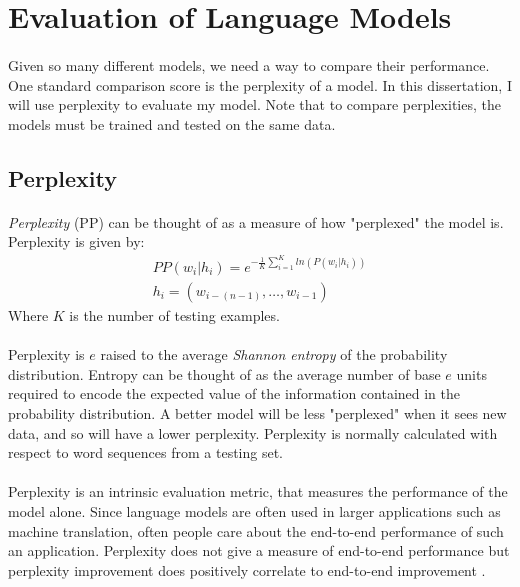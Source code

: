 \section {Evaluation of Language Models}
\paragraph{}
Given so many different models, we need a way to compare their performance. One standard comparison score is the perplexity of a model. In this dissertation, I will use perplexity to evaluate my model. Note that to compare perplexities, the models must be trained and tested on the same data.
\subsection{Perplexity} \label{sec:perplexity}
\paragraph{}
\emph{Perplexity} (PP) can be thought of as a measure of how "perplexed" the model is.
Perplexity is given by:
\begin{align}
PP(w_i | h_i)=e^{- \frac{1}{K} \sum_{i=1}^K ln( P(w_i | h_i) ) } \label{eq:perplexity}
\\ h_i = ( w_{i-(n-1)},\dots, w_{i-1} ) \nonumber
\end{align}
Where $K$ is the number of testing examples. 
\paragraph{}
Perplexity is $e$ raised to the average \emph{Shannon entropy} of the probability distribution. Entropy can be thought of as the average number of base $e$ units required to encode the expected value of the information contained in the probability distribution. A better model will be less "perplexed" when it sees new data, and so will have a lower perplexity.  Perplexity is normally calculated with respect to word sequences from a testing set. 
\paragraph{}
Perplexity is an intrinsic evaluation metric, that measures the performance of the model alone. Since language models are often used in larger applications such as machine translation, often people care about the end-to-end performance of such an application. Perplexity does not give a measure of end-to-end performance but perplexity improvement does positively correlate to end-to-end improvement \cite{Jurafsky2009}.
